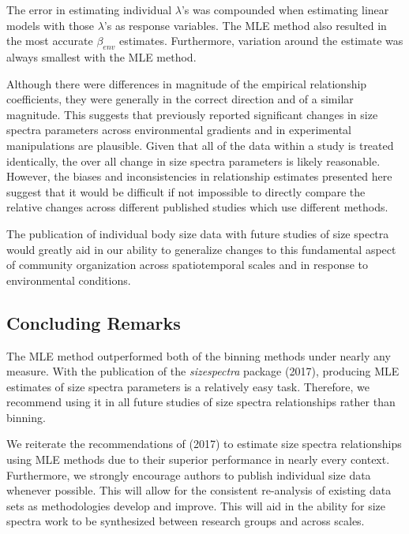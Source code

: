 \documentclass[
]{article}
\begin{document}
The error in estimating individual \(\lambda\)'s was compounded when
estimating linear models with those \(\lambda\)'s as response variables.
The MLE method also resulted in the most accurate \(\beta_{env}\)
estimates. Furthermore, variation around the estimate was always
smallest with the MLE method.

Although there were differences in magnitude of the empirical
relationship coefficients, they were generally in the correct direction
and of a similar magnitude. This suggests that previously reported
significant changes in size spectra parameters across environmental
gradients and in experimental manipulations are plausible. Given that
all of the data within a study is treated identically, the over all
change in size spectra parameters is likely reasonable. However, the
biases and inconsistencies in relationship estimates presented here
suggest that it would be difficult if not impossible to directly compare
the relative changes across different published studies which use
different methods.

The publication of individual body size data with future studies of size
spectra would greatly aid in our ability to generalize changes to this
fundamental aspect of community organization across spatiotemporal
scales and in response to environmental conditions.

\hypertarget{concluding-remarks}{%
\subsection{Concluding Remarks}\label{concluding-remarks}}

The MLE method outperformed both of the binning methods under nearly any
measure. With the publication of the \emph{sizespectra} package (2017),
producing MLE estimates of size spectra parameters is a relatively easy
task. Therefore, we recommend using it in all future studies of size
spectra relationships rather than binning.

We reiterate the recommendations of (2017) to estimate size spectra
relationships using MLE methods due to their superior performance in
nearly every context. Furthermore, we strongly encourage authors to
publish individual size data whenever possible. This will allow for the
consistent re-analysis of existing data sets as methodologies develop
and improve. This will aid in the ability for size spectra work to be
synthesized between research groups and across scales.

\newpage
\end{document}
